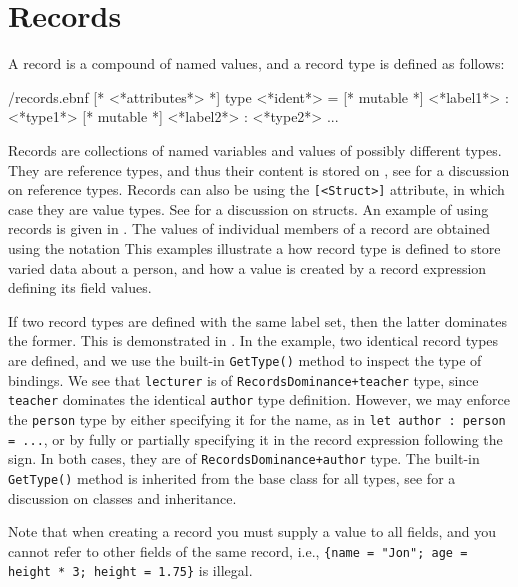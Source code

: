\section{Records}
\label{sec:records}
A record is a compound of named values, and a record type is defined as follows:
%
\begin{verbatimwrite}{\ebnf/records.ebnf}
[* <*attributes*> *] 
type <*ident*> = {
  [* mutable *] <*label1*> : <*type1*>
  [* mutable *] <*label2*> : <*type2*>
  ...
}
\end{verbatimwrite}
%
Records are collections of named variables and values of possibly different types. They are reference types, and thus their content is stored on , see  for a discussion on reference types. Records can also be  using the \lstinline{[<Struct>]} attribute, in which case they are value types. See  for a discussion on structs. An example of using records is given in . The values of individual members of a record are obtained using the  notation
%
%
This examples illustrate a how record type is defined to store varied data about a person, and how a value is created by a record expression defining its field values.

If two record types are defined with the same label set, then the latter dominates the former. This is demonstrated in .
%
%
In the example, two identical record types are defined, and we use the built-in \lstinline{GetType()} method to inspect the type of bindings. We see that \lstinline{lecturer} is of \lstinline{RecordsDominance+teacher} type, since \lstinline{teacher} dominates the identical \lstinline{author} type definition. However, we may enforce the \lstinline{person} type by either specifying it for the name, as in \lstinline{let author : person = ...}, or by fully or partially specifying it in the record expression following the \lexeme{=} sign. In both cases, they are of \lstinline{RecordsDominance+author} type. The built-in \lstinline{GetType()} method is inherited from the base class for all types, see  for a discussion on classes and inheritance.

Note that when creating a record you must supply a value to all fields, and you cannot refer to other fields of the same record, i.e., \lstinline!{name = "Jon"; age = height * 3; height = 1.75}! is illegal.

